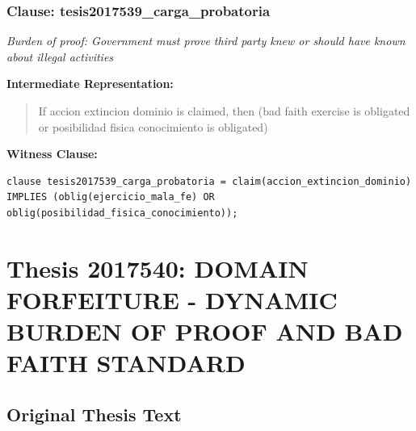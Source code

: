 \documentclass[11pt,a4paper]{article}
\begin{document}
\subsubsection{Clause: tesis2017539\_carga\_probatoria}

\textit{Burden of proof: Government must prove third party knew or should have known about illegal activities}

\textbf{Intermediate Representation:}

\begin{quote}
If accion extincion dominio is claimed, then (bad faith exercise is obligated or posibilidad fisica conocimiento is obligated)
\end{quote}

\textbf{Witness Clause:}

\begin{lstlisting}[style=witnessstyle, language=Witness]
clause tesis2017539_carga_probatoria = claim(accion_extincion_dominio) IMPLIES (oblig(ejercicio_mala_fe) OR oblig(posibilidad_fisica_conocimiento));
\end{lstlisting}

\newpage

\section{Thesis 2017540: DOMAIN FORFEITURE - DYNAMIC BURDEN OF PROOF AND BAD FAITH STANDARD}
\label{thesis:2017540}

\subsection{Original Thesis Text}
\end{document}
